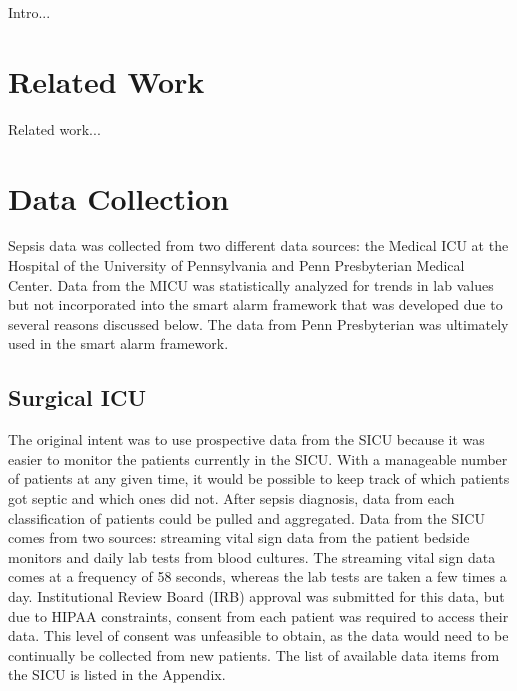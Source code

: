 \documentclass{sig-alternate}
\begin{document}
Intro...

\vspace{10pt}
\section{Related Work}
\vspace{10pt}
\label{sec:related_work}
Related work...

\vspace{10pt}
\section{Data Collection}
\vspace{10pt}
\label{sec:data}

Sepsis data was collected from two different data sources: the Medical ICU at the Hospital of the University of Pennsylvania and Penn Presbyterian Medical Center.  Data from the MICU was statistically analyzed for trends in lab values but not incorporated into the smart alarm framework that was developed due to several reasons discussed below.  The data from Penn Presbyterian was ultimately used in the smart alarm framework.

\vspace{10pt}
\subsection{Surgical ICU}
\label{subsec:sicu}
\vspace{10pt}

The original intent was to use prospective data from the SICU because it was easier to monitor the patients currently in the SICU.  With a manageable number of patients at any given time, it would be possible to keep track of which patients got septic and which ones did not.  After sepsis diagnosis, data from each classification of patients could be pulled and aggregated.  Data from the SICU comes from two sources: streaming vital sign data from the patient bedside monitors and daily lab tests from blood cultures.  The streaming vital sign data comes at a frequency of 58 seconds, whereas the lab tests are taken a few times a day.  Institutional Review Board (IRB) approval was submitted for this data, but due to HIPAA constraints, consent from each patient was required to access their data.  This level of consent was unfeasible to obtain, as the data would need to be continually be collected from new patients.  The list of available data items from the SICU is listed in the Appendix.
\end{document}
